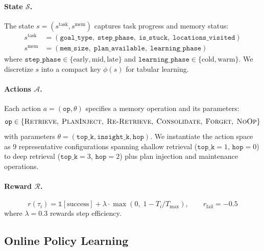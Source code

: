 \documentclass{article} %
\theoremstyle{plain}
\theoremstyle{definition}
\theoremstyle{remark}
\begin{document}
\paragraph{State $\mathcal{S}$.} The state $s = (s^{\text{task}}, s^{\text{mem}})$ captures task progress and memory status:
\begin{align}
    s^{\text{task}} &= (\texttt{goal\_type},\; \texttt{step\_phase},\; \texttt{is\_stuck},\; \texttt{locations\_visited}) \\
    s^{\text{mem}} &= (\texttt{mem\_size},\; \texttt{plan\_available},\; \texttt{learning\_phase})
\end{align}
where $\texttt{step\_phase} \in \{\text{early}, \text{mid}, \text{late}\}$ and $\texttt{learning\_phase} \in \{\text{cold}, \text{warm}\}$.
We discretize $s$ into a compact key $\phi(s)$ for tabular learning.

\paragraph{Actions $\mathcal{A}$.} Each action $a = (\texttt{op}, \theta)$ specifies a memory operation and its parameters:
\begin{equation}
    \texttt{op} \in \{\textsc{Retrieve},\; \textsc{PlanInject},\; \textsc{Re-Retrieve},\; \textsc{Consolidate},\; \textsc{Forget},\; \textsc{NoOp}\}
\end{equation}
with parameters $\theta = (\texttt{top\_k}, \texttt{insight\_k}, \texttt{hop})$.
We instantiate the action space as 9 representative configurations spanning shallow retrieval ($\texttt{top\_k}\!=\!1$, $\texttt{hop}\!=\!0$) to deep retrieval ($\texttt{top\_k}\!=\!3$, $\texttt{hop}\!=\!2$) plus plan injection and maintenance operations.

\paragraph{Reward $\mathcal{R}$.}
\begin{equation}
    r(\tau_i) = \mathbb{1}[\text{success}] + \lambda \cdot \max\!\left(0,\; 1 - T_i / T_{\max}\right), \qquad r_{\text{fail}} = -0.5
\end{equation}
where $\lambda = 0.3$ rewards step efficiency.


\subsection{Online Policy Learning}
\label{sec:policy}
\end{document}
